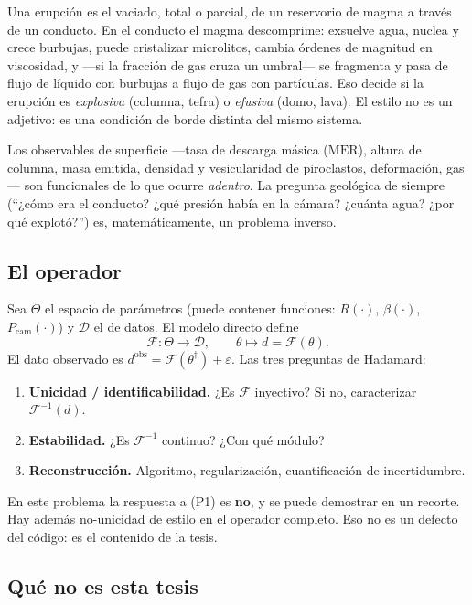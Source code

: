 \documentclass[11pt,a4paper]{article}
\theoremstyle{plain}
\theoremstyle{definition}
\theoremstyle{remark}
\newcommand{\MER}{\mathrm{MER}}
\newcommand{\F}{\mathcal{F}}
\begin{document}
Una erupción es el vaciado, total o parcial, de un reservorio de magma
a través de un conducto. En el conducto el magma descomprime: exsuelve
agua, nuclea y crece burbujas, puede cristalizar microlitos, cambia
órdenes de magnitud en viscosidad, y ---si la fracción de gas cruza un
umbral--- se fragmenta y pasa de flujo de líquido con burbujas a flujo
de gas con partículas. Eso decide si la erupción es \emph{explosiva}
(columna, tefra) o \emph{efusiva} (domo, lava). El estilo no es un
adjetivo: es una condición de borde distinta del mismo sistema.

Los observables de superficie ---tasa de descarga másica ($\MER$),
altura de columna, masa emitida, densidad y vesicularidad de
piroclastos, deformación, gas--- son funcionales de lo que ocurre
\emph{adentro}. La pregunta geológica de siempre (``¿cómo era el
conducto? ¿qué presión había en la cámara? ¿cuánta agua? ¿por qué
explotó?'') es, matemáticamente, un problema inverso.

\subsection{El operador}

Sea $\Theta$ el espacio de parámetros (puede contener funciones:
$R(\cdot)$, $\beta(\cdot)$, $P_{\mathrm{cam}}(\cdot)$) y $\mathcal{D}$
el de datos. El modelo directo define
\begin{equation}
\F:\Theta\longrightarrow\mathcal{D},\qquad
\theta\longmapsto d=\F(\theta).
\end{equation}
El dato observado es $d^{\mathrm{obs}}=\F(\theta^\dagger)+\varepsilon$.
Las tres preguntas de Hadamard:

\begin{enumerate}[label=(P\arabic*)]
\item \textbf{Unicidad / identificabilidad.}
  ¿Es $\F$ inyectivo? Si no, caracterizar $\F^{-1}(d)$.
\item \textbf{Estabilidad.}
  ¿Es $\F^{-1}$ continuo? ¿Con qué módulo?
\item \textbf{Reconstrucción.}
  Algoritmo, regularización, cuantificación de incertidumbre.
\end{enumerate}

En este problema la respuesta a (P1) es \textbf{no}, y se puede
demostrar en un recorte. Hay además no-unicidad de estilo en el
operador completo. Eso no es un defecto del código: es el contenido
de la tesis.

\subsection{Qué no es esta tesis}
\end{document}
